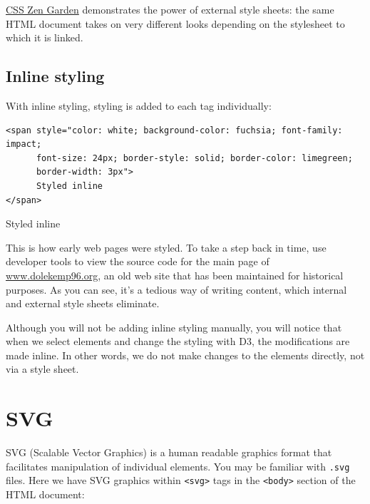 \documentclass[
  openany]{book}
\begin{document}
\href{http://www.csszengarden.com/}{CSS Zen Garden} demonstrates the power of external style sheets: the same HTML document takes on very different looks depending on the stylesheet to which it is linked.

\hypertarget{inline-styling}{%
\subsection{Inline styling}\label{inline-styling}}

With inline styling, styling is added to each tag individually:

\begin{verbatim}
<span style="color: white; background-color: fuchsia; font-family: impact; 
      font-size: 24px; border-style: solid; border-color: limegreen; 
      border-width: 3px">
      Styled inline
</span>
\end{verbatim}

{Styled inline}

This is how early web pages were styled. To take a step back in time, use developer tools to view the source code for the main page of \href{http://www.dolekemp96.org/main.htm}{www.dolekemp96.org}, an old web site that has been maintained for historical purposes. As you can see, it's a tedious way of writing content, which internal and external style sheets eliminate.

Although you will not be adding inline styling manually, you will notice that when we select elements and change the styling with D3, the modifications are made inline. In other words, we do not make changes to the elements directly, not via a style sheet.

\hypertarget{svg}{%
\section{\texorpdfstring{SVG }{SVG }}\label{svg}}

SVG (Scalable Vector Graphics) is a human readable graphics format that facilitates manipulation of individual elements. You may be familiar with \texttt{.svg} files. Here we have SVG graphics within \texttt{\textless{}svg\textgreater{}} tags in the \texttt{\textless{}body\textgreater{}} section of the HTML document:
\end{document}
